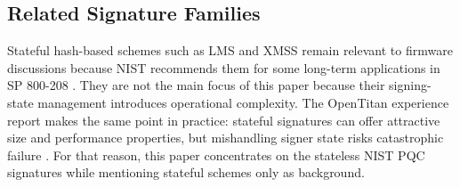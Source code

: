 \subsection{Related Signature Families}

Stateful hash-based schemes such as LMS and XMSS remain relevant to firmware discussions because NIST recommends them for some long-term applications in SP 800-208 \cite{sp800208}. They are not the main focus of this paper because their signing-state management introduces operational complexity. The OpenTitan experience report makes the same point in practice: stateful signatures can offer attractive size and performance properties, but mishandling signer state risks catastrophic failure \cite{zerorisc_opentitan}. For that reason, this paper concentrates on the stateless NIST PQC signatures while mentioning stateful schemes only as background.

